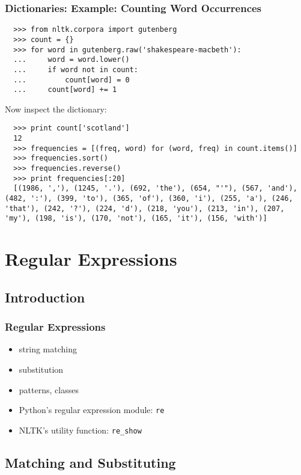 \documentclass{beamer}             %
\begin{document}
\begin{frame}[fragile]
\frametitle{Dictionaries: Example: Counting Word Occurrences}
\small

\begin{verbatim}
  >>> from nltk.corpora import gutenberg
  >>> count = {}
  >>> for word in gutenberg.raw('shakespeare-macbeth'):
  ...     word = word.lower()
  ...     if word not in count:
  ...         count[word] = 0
  ...     count[word] += 1
\end{verbatim}

Now inspect the dictionary:

\begin{verbatim}
  >>> print count['scotland']
  12
  >>> frequencies = [(freq, word) for (word, freq) in count.items()]
  >>> frequencies.sort()
  >>> frequencies.reverse()
  >>> print frequencies[:20]
  [(1986, ','), (1245, '.'), (692, 'the'), (654, "'"), (567, 'and'), (482, ':'), (399, 'to'), (365, 'of'), (360, 'i'), (255, 'a'), (246, 'that'), (242, '?'), (224, 'd'), (218, 'you'), (213, 'in'), (207, 'my'), (198, 'is'), (170, 'not'), (165, 'it'), (156, 'with')]
\end{verbatim}
\end{frame}

\section{Regular Expressions}

\subsection{Introduction}

\begin{frame}
\frametitle{Regular Expressions}
\begin{itemize}
\item string matching
\item substitution
\item patterns, classes
\item Python's regular expression module: \texttt{re}
\item NLTK's utility function: \texttt{re\_show}
\end{itemize}
\end{frame}

\subsection{Matching and Substituting}
\end{document}
